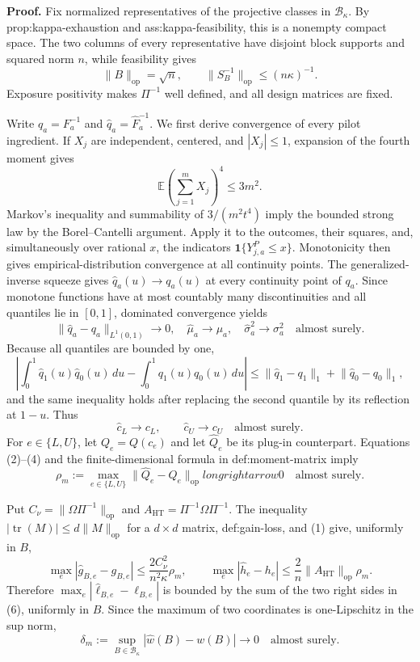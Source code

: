 \textbf{Proof.}
Fix normalized representatives of the projective classes in \(\mathcal B_\kappa\).  By prop:kappa-exhaustion and ass:kappa-feasibility, this is a nonempty compact space.  The two columns of every representative have disjoint block supports and squared norm \(n\), while feasibility gives
\[
\lVert B\rVert_{\mathrm{op}}=\sqrt n,
\qquad
\lVert S_B^{-1}\rVert_{\mathrm{op}}\le(n\kappa)^{-1}.
\tag{1}
\]
Exposure positivity makes \(\Pi^{-1}\) well defined, and all design matrices are fixed.

Write \(q_a=F_a^{-1}\) and \(\widehat q_a=\widehat F_a^{-1}\).  We first derive convergence of every pilot ingredient.  If \(X_j\) are independent, centered, and \(|X_j|\le1\), expansion of the fourth moment gives
\[
\mathbb E\left(\sum_{j=1}^mX_j\right)^4
\le 3m^2.
\]
Markov's inequality and summability of \(3/(m^2t^4)\) imply the bounded strong law by the Borel--Cantelli argument.  Apply it to the outcomes, their squares, and, simultaneously over rational \(x\), the indicators \(\mathbf1\{Y^P_{j,a}\le x\}\).  Monotonicity then gives empirical-distribution convergence at all continuity points.  The generalized-inverse squeeze gives \(\widehat q_a(u)\to q_a(u)\) at every continuity point of \(q_a\).  Since monotone functions have at most countably many discontinuities and all quantiles lie in \([0,1]\), dominated convergence yields
\[
\lVert\widehat q_a-q_a\rVert_{L^1(0,1)}\longrightarrow0,
\quad
\widehat\mu_a\longrightarrow\mu_a,
\quad
\widehat\sigma_a^2\longrightarrow\sigma_a^2
\quad\text{almost surely}.
\tag{2}
\]
Because all quantiles are bounded by one,
\[
\left|\int_0^1\widehat q_1(u)\widehat q_0(u)\,du-
\int_0^1q_1(u)q_0(u)\,du\right|
\le\lVert\widehat q_1-q_1\rVert_1+
\lVert\widehat q_0-q_0\rVert_1,
\tag{3}
\]
and the same inequality holds after replacing the second quantile by its reflection at \(1-u\).  Thus
\[
\widehat c_L\to c_L,
\qquad \widehat c_U\to c_U
\quad\text{almost surely}.
\tag{4}
\]
For \(e\in\{L,U\}\), let \(Q_e=Q(c_e)\) and let \(\widehat Q_e\) be its plug-in counterpart.  Equations (2)--(4) and the finite-dimensional formula in def:moment-matrix imply
\[
\rho_m:=\max_{e\in\{L,U\}}
\lVert\widehat Q_e-Q_e\rVert_{\mathrm{op}}longrightarrow0
\quad\text{almost surely}.
\tag{5}
\]

Put \(C_\nu=\lVert\Omega\Pi^{-1}\rVert_{\mathrm{op}}\) and \(A_{\mathrm{HT}}=\Pi^{-1}\Omega\Pi^{-1}\).  The inequality \(|\operatorname{tr}(M)|\le d\lVert M\rVert_{\mathrm{op}}\) for a \(d\times d\) matrix, def:gain-loss, and (1) give, uniformly in \(B\),
\[
\max_e|\widehat g_{B,e}-g_{B,e}|
\le \frac{2C_\nu^2}{n^2\kappa}\rho_m,
\qquad
\max_e|\widehat h_e-h_e|
\le \frac{2}{n}\lVert A_{\mathrm{HT}}\rVert_{\mathrm{op}}\rho_m.
\tag{6}
\]
Therefore \(\max_e|\widehat\ell_{B,e}-\ell_{B,e}|\) is bounded by the sum of the two right sides in (6), uniformly in \(B\).  Since the maximum of two coordinates is one-Lipschitz in the sup norm,
\[
\delta_m:=\sup_{B\in\mathcal B_\kappa}
|\widehat w(B)-w(B)|\longrightarrow0
\quad\text{almost surely}.
\tag{7}
\]

